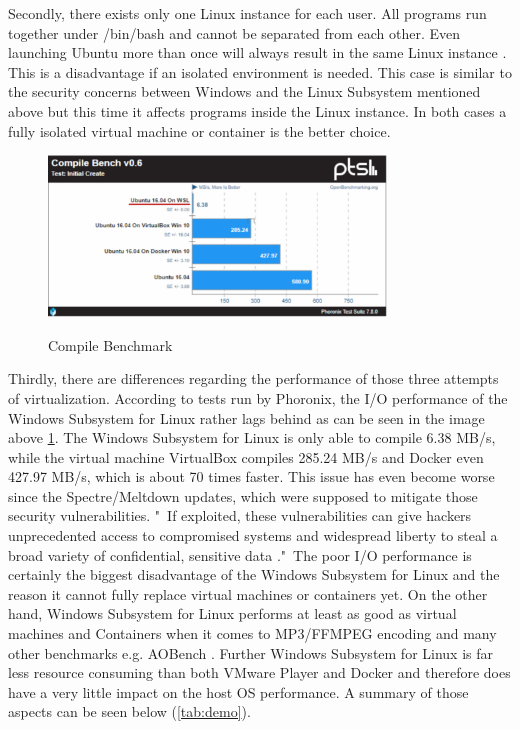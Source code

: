 \documentclass[utf8,biblatex, ngerman, english]{lni}
\begin{document}
Secondly, there exists only one Linux instance for each user. All programs run together under /bin/bash and cannot be separated from each other. Even launching Ubuntu more than once will always result in the same Linux instance \cite{Ha16b}. This is a disadvantage if an isolated environment is needed. This case is similar to the security concerns between Windows and the Linux Subsystem mentioned above but this time it affects programs inside the Linux instance. In both cases a fully isolated virtual machine or container is the better choice.

\begin{figure}
  \centering
  \includegraphics[width=0.8\textwidth]{CompileSpeed.pdf}
  \caption{Compile Benchmark} \cite{La18} 
  \label{img:speed}
\end{figure}

Thirdly, there are differences regarding the performance of those three attempts of virtualization. According to tests run by Phoronix, the I/O performance of the Windows Subsystem for Linux rather lags behind as can be seen in the image above \ref{img:speed}. The Windows Subsystem for Linux is only able to compile 6.38 MB/s, while the virtual machine VirtualBox compiles 285.24 MB/s and Docker even 427.97 MB/s, which is about 70 times faster. This issue has even become worse since the Spectre/Meltdown updates, which were supposed to mitigate those security vulnerabilities. "\ If exploited, these vulnerabilities can give hackers unprecedented access to compromised systems and widespread liberty to steal a broad variety of confidential, sensitive data \cite{Pe18}."\ The poor I/O performance is certainly the biggest disadvantage of the Windows Subsystem for Linux and the reason it cannot fully replace virtual machines or containers yet. On the other hand, Windows Subsystem for Linux performs at least as good as virtual machines and Containers when it comes to MP3/FFMPEG encoding and many other benchmarks e.g. AOBench \cite{La18}. Further Windows Subsystem for Linux is far less resource consuming than both VMware Player and Docker and therefore does have a very little impact on the host OS performance. A summary of those aspects can be seen below (\ref{tab:demo}).
\end{document}
